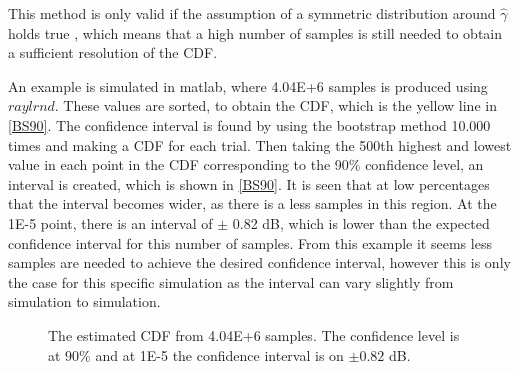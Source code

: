 This method is only valid if the assumption of a symmetric distribution around $\hat{\gamma}$ holds true \citep{Bootstrap}, which means that a high number of samples is still needed to obtain a sufficient resolution of the CDF. 

An example is simulated in matlab, where 4.04E+6 samples is produced using $raylrnd$. These values are sorted, to obtain the CDF, which is the yellow line in \autoref{BS90}. The confidence interval is found by using the bootstrap method 10.000 times and making a CDF for each trial. Then taking the 500th highest and lowest value in each point in the CDF corresponding to the 90\% confidence level, an interval is created, which is shown in \autoref{BS90}. It is seen that at low percentages that the interval becomes wider, as there is a less samples in this region. At the 1E-5 point, there is an interval of $\pm$ 0.82 dB, which is lower than the expected confidence interval for this number of samples. From this example it seems less samples are needed to achieve the desired confidence interval, however this is only the case for this specific simulation as the interval can vary slightly from simulation to simulation.

\begin{figure}[H]
\center

\caption{The estimated CDF from 4.04E+6 samples. The confidence level is at 90\% and at 1E-5 the confidence interval is on $\pm 0.82$ dB.}
\label{BS90}
\end{figure}




